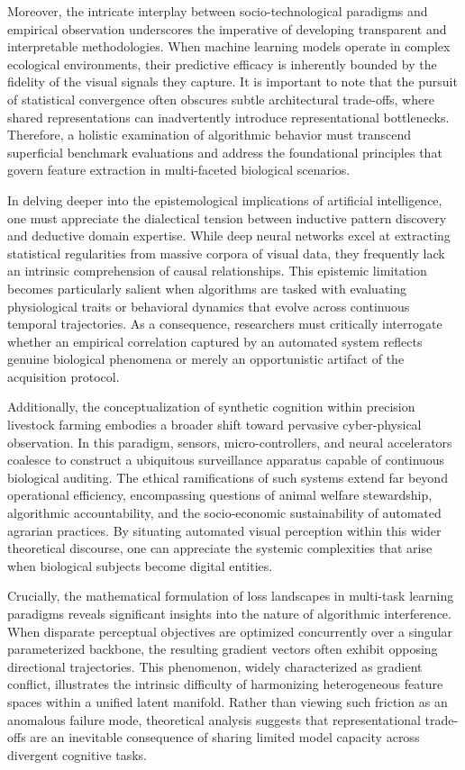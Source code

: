\documentclass[Times,12pt,oneside,openany,print,index]{report}
\begin{document}
Moreover, the intricate interplay between socio-technological paradigms and empirical observation underscores the imperative of developing transparent and interpretable methodologies. When machine learning models operate in complex ecological environments, their predictive efficacy is inherently bounded by the fidelity of the visual signals they capture. It is important to note that the pursuit of statistical convergence often obscures subtle architectural trade-offs, where shared representations can inadvertently introduce representational bottlenecks. Therefore, a holistic examination of algorithmic behavior must transcend superficial benchmark evaluations and address the foundational principles that govern feature extraction in multi-faceted biological scenarios.

In delving deeper into the epistemological implications of artificial intelligence, one must appreciate the dialectical tension between inductive pattern discovery and deductive domain expertise. While deep neural networks excel at extracting statistical regularities from massive corpora of visual data, they frequently lack an intrinsic comprehension of causal relationships. This epistemic limitation becomes particularly salient when algorithms are tasked with evaluating physiological traits or behavioral dynamics that evolve across continuous temporal trajectories. As a consequence, researchers must critically interrogate whether an empirical correlation captured by an automated system reflects genuine biological phenomena or merely an opportunistic artifact of the acquisition protocol.

Additionally, the conceptualization of synthetic cognition within precision livestock farming embodies a broader shift toward pervasive cyber-physical observation. In this paradigm, sensors, micro-controllers, and neural accelerators coalesce to construct a ubiquitous surveillance apparatus capable of continuous biological auditing. The ethical ramifications of such systems extend far beyond operational efficiency, encompassing questions of animal welfare stewardship, algorithmic accountability, and the socio-economic sustainability of automated agrarian practices. By situating automated visual perception within this wider theoretical discourse, one can appreciate the systemic complexities that arise when biological subjects become digital entities.

Crucially, the mathematical formulation of loss landscapes in multi-task learning paradigms reveals significant insights into the nature of algorithmic interference. When disparate perceptual objectives are optimized concurrently over a singular parameterized backbone, the resulting gradient vectors often exhibit opposing directional trajectories. This phenomenon, widely characterized as gradient conflict, illustrates the intrinsic difficulty of harmonizing heterogeneous feature spaces within a unified latent manifold. Rather than viewing such friction as an anomalous failure mode, theoretical analysis suggests that representational trade-offs are an inevitable consequence of sharing limited model capacity across divergent cognitive tasks.
\end{document}
